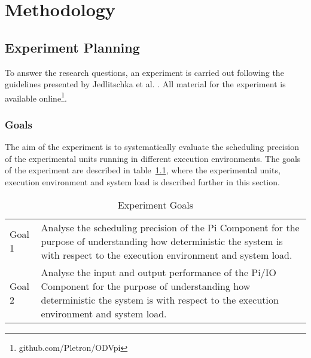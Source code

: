 \iffalse  \fi
\chapter{Methodology}

\section{Experiment Planning}
To answer the research questions, an experiment is carried out following the guidelines presented by Jedlitschka et al. \cite{Andreas}. All material for the experiment is available online\footnote{github.com/Pletron/ODVpi}. 


\subsection{Goals}


The aim of the experiment is to systematically evaluate the scheduling precision of the experimental units running in different execution environments. The goals of the experiment are described in table~\ref{table:exp-goals}, where the experimental units, execution environment and system load is described further in this section.  


\begin{table}[ht]
\begin{tabular}{l|p{12cm}}
Goal 1 & Analyse the scheduling precision of the Pi Component for the purpose of understanding how deterministic the system is with respect to the execution environment and system load. \\
Goal 2 & Analyse the input and output performance of the Pi/IO Component for the purpose of understanding how deterministic the system is with respect to the execution environment and system load.
\end{tabular}
\centering
\caption{Experiment Goals}
\label{table:exp-goals}
\end{table}


